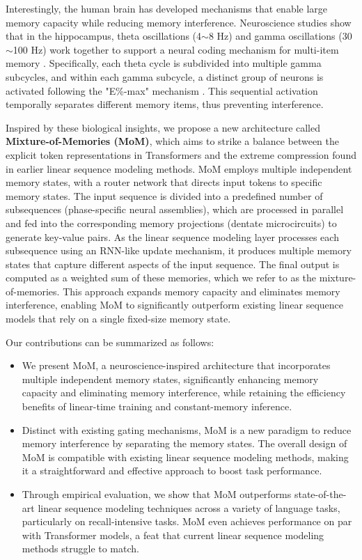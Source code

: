 Interestingly, the human brain has developed mechanisms that enable large memory capacity while reducing memory interference. Neuroscience studies show that in the hippocampus, theta oscillations (4$\sim$8 Hz) and gamma oscillations (30$\sim$100 Hz) work together to support a neural coding mechanism for multi-item memory \cite{buzsaki2002theta, lisman2013theta}. Specifically, each theta cycle is subdivided into multiple gamma subcycles, and within each gamma subcycle, a distinct group of neurons is activated following the "E\%-max" mechanism \cite{de2009second}. This sequential activation temporally separates different memory items, thus preventing interference.


Inspired by these biological insights, we propose a new architecture called \textbf{Mixture-of-Memories (MoM)}, which aims to strike a balance between the explicit token representations in Transformers and the extreme compression found in earlier linear sequence modeling methods. MoM employs multiple independent memory states, with a router network that directs input tokens to specific memory states. The input sequence is divided into a predefined number of subsequences (phase-specific neural assemblies), which are processed in parallel and fed into the corresponding memory projections (dentate microcircuits) to generate key-value pairs. As the linear sequence modeling layer processes each subsequence using an RNN-like update mechanism, it produces multiple memory states that capture different aspects of the input sequence. The final output is computed as a weighted sum of these memories, which we refer to as the mixture-of-memories. This approach expands memory capacity and eliminates memory interference, enabling MoM to significantly outperform existing linear sequence models that rely on a single fixed-size memory state.


Our contributions can be summarized as follows:

\begin{itemize}[noitemsep,topsep=0pt,parsep=0pt,partopsep=0pt]
    \item We present MoM, a neuroscience-inspired architecture that incorporates multiple independent memory states, significantly enhancing memory capacity and eliminating memory interference, while retaining the efficiency benefits of linear-time training and constant-memory inference.
    \item Distinct with existing gating mechanisms, MoM is a new paradigm to reduce memory interference by separating the memory states. The overall design of MoM is compatible with existing linear sequence modeling methods, making it a straightforward and effective approach to boost task performance.
    \item Through empirical evaluation, we show that MoM outperforms state-of-the-art linear sequence modeling techniques across a variety of language tasks, particularly on recall-intensive tasks. MoM even achieves performance on par with Transformer models, a feat that current linear sequence modeling methods struggle to match.
\end{itemize}


